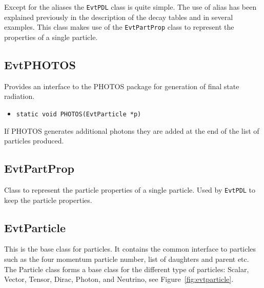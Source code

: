Except for the aliases the {\tt EvtPDL} class is quite simple. The use
of alias has been explained previously in the description of the
decay tables and in several examples. This class makes use of the 
{\tt EvtPartProp} class to represent the properties of a single particle.


\subsection{EvtPHOTOS}

Provides an interface to the PHOTOS package for generation of 
final state radiation.

\begin{itemize}
\item {\tt static void PHOTOS(EvtParticle *p)}\\
\end{itemize}

If PHOTOS generates additional photons they are added at the 
end of the list of particles produced.

\subsection{EvtPartProp}

Class to represent the particle properties of a single
particle. Used by {\tt EvtPDL} to keep the particle
properties.

\subsection{EvtParticle}




This is the base class for particles. It contains the common
interface to particles such as
the four momentum particle number, list of daughters and parent
etc. The Particle class forms a base class for the different
type of particles: Scalar, Vector, Tensor, Dirac, Photon,
and Neutrino, see Figure~\ref{fig:evtparticle}.

